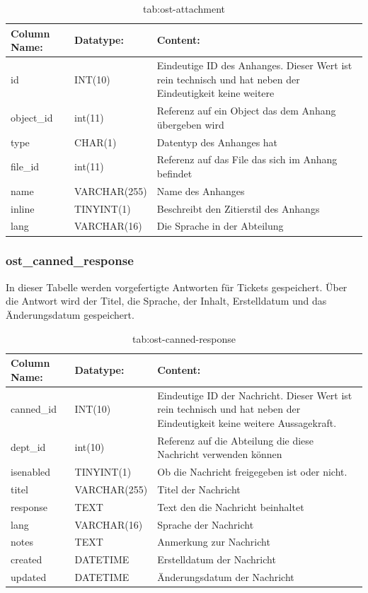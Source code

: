 \begin{table}[h]
	\begin{tabular}{|p{3.5cm}|p{4cm}|p{7.2cm}|}
		\hline
		\textbf{Column Name:} & \textbf{Datatype:} & \textbf{Content:} \\
		\hline
		id & INT(10) & Eindeutige ID des Anhanges. Dieser Wert ist rein technisch und hat  neben der Eindeutigkeit keine weitere  \\
		\hline
		object\_id & int(11) & Referenz auf ein Object das dem Anhang übergeben wird \\
		\hline
		type & CHAR(1) & Datentyp des Anhanges hat \\
		\hline
		file\_id & int(11) & Referenz auf das File das sich im Anhang befindet\\
		\hline
		name & VARCHAR(255) & Name des Anhanges \\
		\hline
		inline & TINYINT(1) & Beschreibt den Zitierstil des Anhangs \\
		\hline
		lang & VARCHAR(16) & Die Sprache in der Abteilung \\
		\hline
	\end{tabular}
	\caption{tab:ost-attachment}
\end{table}
\label{tab:ost_attachment}

\newpage
\subsubsection{ost\_canned\_response}

In dieser Tabelle werden vorgefertigte Antworten für Tickets gespeichert. Über die Antwort wird der Titel, die Sprache, der Inhalt, Erstelldatum und das Änderungsdatum gespeichert.

\begin{table}[h]
	\begin{tabular}{|p{3.5cm}|p{4cm}|p{7.2cm}|}
		\hline
		\textbf{Column Name:} & \textbf{Datatype:} & \textbf{Content:}\\
		\hline
		canned\_id & INT(10) & Eindeutige ID der Nachricht. Dieser Wert ist rein technisch und hat  neben der Eindeutigkeit keine weitere 
		Aussagekraft.\\
		\hline
		dept\_id & int(10) & Referenz auf die Abteilung die diese Nachricht verwenden können\\
		\hline
		isenabled & TINYINT(1) & Ob die Nachricht freigegeben ist oder nicht.\\
		\hline
		titel & VARCHAR(255) & Titel der Nachricht\\
		\hline
		response & TEXT & Text den die Nachricht beinhaltet\\
		\hline
		lang & VARCHAR(16) & Sprache der Nachricht\\
		\hline
		notes & TEXT & Anmerkung zur Nachricht\\
		\hline
		created & DATETIME & Erstelldatum der Nachricht\\
		\hline
		updated & DATETIME & Änderungsdatum der Nachricht\\
		\hline
	\end{tabular}
	\caption{tab:ost-canned-response}
\end{table}
\label{tab:ost_canned_response}


